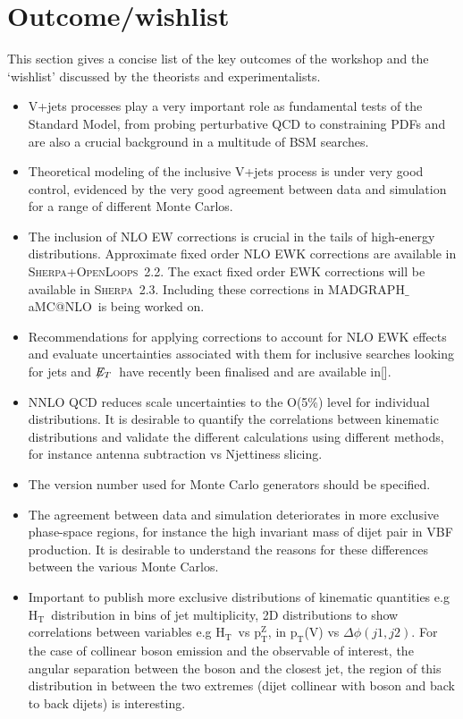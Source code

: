 \documentclass[a4paper,11pt,notoc]{article}
\makeatletter
\newcommand{\pt}{\ensuremath{\mathrm{p_T}}}
\newcommand{\ptZ}{\ensuremath{\mathrm{p_T^{Z}}}}
\newcommand{\Ht}{\ensuremath{\mathrm{H_T}}}
\newcommand{\met}{\ensuremath{\not\!\!E_T}}
\newcommand{\SHERPA}{\textsc{Sherpa}}
\newcommand{\OPENLOOPS}{\textsc{OpenLoops}}
\newcommand{\MGNLO}{MADGRAPH$\_$aMC@NLO}
\makeatother
\begin{document}
\section{Outcome/wishlist}
This section gives a concise list of the key outcomes of the workshop and the `wishlist' discussed by the theorists and experimentalists. 
\begin{itemize}
\item V+jets processes play a very important role as fundamental tests of the Standard Model, from probing perturbative QCD to constraining PDFs and are also a crucial background in a multitude of BSM searches.
\item Theoretical modeling of the inclusive V+jets process is under very good control, evidenced by the very good agreement between data and simulation for a range of different Monte Carlos.
\item The inclusion of NLO EW corrections is crucial in the tails of high-energy distributions. Approximate fixed order NLO EWK corrections are available in \SHERPA+\OPENLOOPS\ 2.2. The exact fixed order EWK corrections will be available in \SHERPA\ 2.3. Including these corrections in \MGNLO\ is being worked on.
\item Recommendations for applying corrections to account for NLO EWK effects and evaluate uncertainties associated with them for inclusive searches looking for jets and \met\ have recently been finalised and are available in[].
\item NNLO QCD reduces scale uncertainties to the O(5\%) level for individual distributions. It is desirable to quantify the correlations between kinematic distributions and validate the different calculations using different methods, for instance antenna subtraction vs Njettiness slicing.
\item The version number used for Monte Carlo generators should be specified.
\item The agreement between data and simulation deteriorates in more exclusive phase-space regions, for instance the high invariant mass of dijet pair in VBF production. It is desirable to understand the reasons for these differences between the various Monte Carlos.
\item Important to publish more exclusive distributions of kinematic quantities e.g \Ht\ distribution in bins of jet multiplicity, 2D distributions to show correlations between variables e.g \Ht\ vs \ptZ, in \pt(V) vs $\Delta\phi(j1,j2)$. For the case of collinear boson emission and the observable of interest, the angular separation between the boson and the closest jet, the region of this distribution in between the two extremes (dijet collinear with boson and back to back dijets) is interesting. 

\end{itemize}
\end{document}
